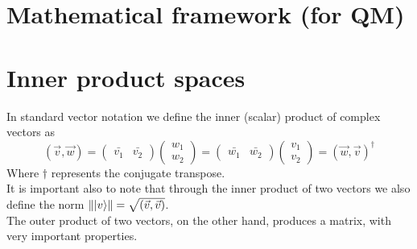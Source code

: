 
\section{Mathematical framework (for QM)}
	
	
	
	\section{Inner product spaces}
	In standard vector notation we define the inner (scalar) product of complex vectors as
	$$ ( \vec{v}, \vec{w} ) =  \begin{pmatrix} \bar{v_1} & \bar{v_2}\end{pmatrix} \begin{pmatrix} w_1 \\ w_2 \end{pmatrix} = \begin{pmatrix} \bar{w_1} & \bar{w_2}\end{pmatrix} \begin{pmatrix} v_1 \\ v_2 \end{pmatrix} = ( \vec{w}, \vec{v} )^{\dagger}$$
	Where $\dagger$ represents the conjugate transpose.\\
	
	It is important also to note that through the inner product of two vectors we also define the norm $\||v \rangle\|  =  \sqrt{( \vec{v}, \vec{v} )} $.\\
	
	
	The outer product of two vectors, on the other hand, produces a matrix, with very important properties.  
	
